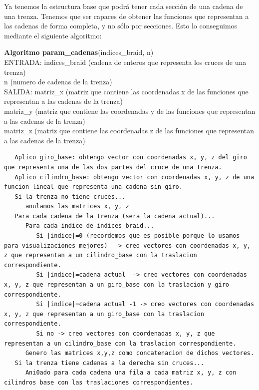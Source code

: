  \bigskip
 Ya tenemos la estructura base que podrá tener cada sección de una cadena de una trenza. Tenemos que ser capaces de obtener las funciones que representan a las cadenas de forma completa, y no sólo por secciones. Esto lo conseguimos mediante el siguiente algoritmo:
 \begin{alg}
 	\textbf{Algoritmo param\_cadenas}(indices\_braid, n)\\
 	ENTRADA: indices\_braid (cadena de enteros que representa los cruces de una trenza)\\
 	\hspace*{2.2cm} n (numero de cadenas de la trenza)\\
 	SALIDA: \hspace{0.4cm} matriz\_x (matriz que contiene las coordenadas x de las funciones que representan a las cadenas de la trenza)\\
 	\hspace*{2.2cm} matriz\_y (matriz que contiene las coordenadas y de las funciones que representan a las cadenas de la trenza)\\
 	\hspace*{2.2cm} matriz\_z (matriz que contiene las coordenadas z de las funciones que representan a las cadenas de la trenza)
 	
\begin{lstlisting}
   Aplico giro_base: obtengo vector con coordenadas x, y, z del giro que representa una de las dos partes del cruce de una trenza. 
   Aplico cilindro_base: obtengo vector con coordenadas x, y, z de una funcion lineal que representa una cadena sin giro. 
   Si la trenza no tiene cruces...
      anulamos las matrices x, y, z 
   Para cada cadena de la trenza (sera la cadena actual)...
      Para cada indice de indices_braid...
         Si |indice|=0 (recordemos que es posible porque lo usamos para visualizaciones mejores)  -> creo vectores con coordenadas x, y, z que representan a un cilindro_base con la traslacion correspondiente.
         Si |indice|=cadena actual  -> creo vectores con coordenadas x, y, z que representan a un giro_base con la traslacion y giro correspondiente.  
         Si |indice|=cadena actual -1 -> creo vectores con coordenadas x, y, z que representan a un giro_base con la traslacion correspondiente.
         Si no -> creo vectores con coordenadas x, y, z que representan a un cilindro_base con la traslacion correspondiente. 
      Genero las matrices x,y,z como concatenacion de dichos vectores. 
   Si la trenza tiene cadenas a la derecha sin cruces...
      Ani0ado para cada cadena una fila a cada matriz x, y, z con cilindros base con las traslaciones correspondientes. 
      
         
\end{lstlisting}
 \end{alg}
 
